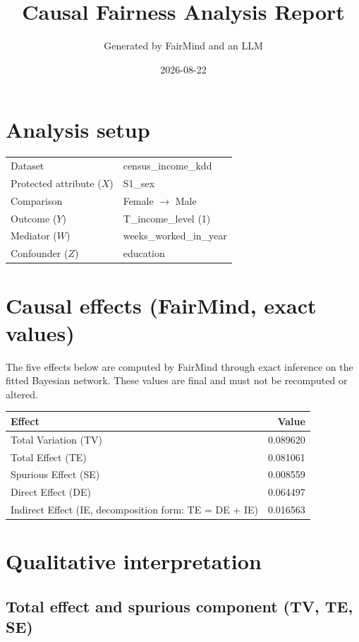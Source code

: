 \documentclass[11pt]{article}
\title{Causal Fairness Analysis Report}
\author{Generated by FairMind and an LLM}
\date{2026-08-22}
\begin{document}
\maketitle

\section{Analysis setup}

\begin{tabular}{ll}
\toprule
Dataset & census\_income\_kdd \\
Protected attribute ($X$) & S1\_sex \\
Comparison & Female $\to$ Male \\
Outcome ($Y$) & T\_income\_level (1) \\
Mediator ($W$) & weeks\_worked\_in\_year \\
Confounder ($Z$) & education \\
\bottomrule
\end{tabular}

\section{Causal effects (FairMind, exact values)}

The five effects below are computed by FairMind through exact inference on the
fitted Bayesian network. These values are final and must not be recomputed or
altered.

\begin{tabular}{lr}
\toprule
Effect & Value \\
\midrule
Total Variation (TV) & 0.089620 \\
Total Effect (TE) & 0.081061 \\
Spurious Effect (SE) & 0.008559 \\
Direct Effect (DE) & 0.064497 \\
Indirect Effect (IE, decomposition form: TE = DE + IE) & 0.016563 \\
\bottomrule
\end{tabular}

\section{Qualitative interpretation}

\subsection{Total effect and spurious component (TV, TE, SE)}
\end{document}
